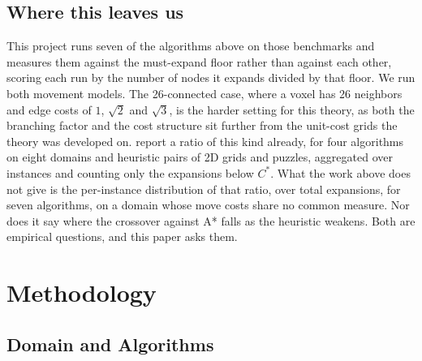 \documentclass[letterpaper]{article} %
\begin{document}
\subsection{Where this leaves us}
This project runs seven of the algorithms above on those benchmarks and measures them against the must-expand floor rather than against each other, scoring each run by the number of nodes it expands divided by that floor. We run both movement models. The 26-connected case, where a voxel has 26 neighbors and edge costs of $1$, $\sqrt{2}$ and $\sqrt{3}$, is the harder setting for this theory, as both the branching factor and the cost structure sit further from the unit-cost grids the theory was developed on. \citet{shaham2017minimal} report a ratio of this kind already, for four algorithms on eight domains and heuristic pairs of 2D grids and puzzles, aggregated over instances and counting only the expansions below $C^*$. What the work above does not give is the per-instance distribution of that ratio, over total expansions, for seven algorithms, on a domain whose move costs share no common measure. Nor does it say where the crossover against A* falls as the heuristic weakens. Both are empirical questions, and this paper asks them.

\section{Methodology}
\subsection{Domain and Algorithms}
\end{document}
